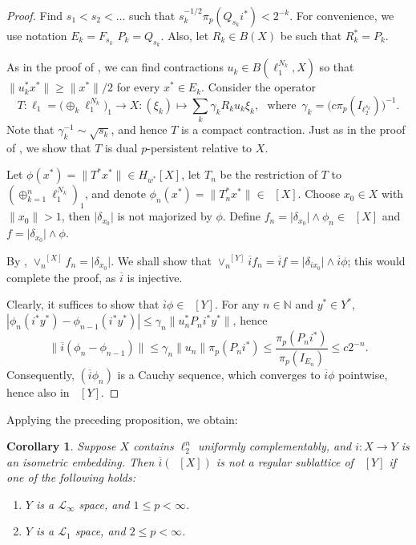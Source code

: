 \documentclass{amsart}
\theoremstyle{plain}
\newtheorem{corollary}[theorem]{Corollary}
\theoremstyle{definition}
\numberwithin{equation}{section}
\newcommand{\N}{\mathbb{N}}
\DeclareMathOperator{\FBLp}{FBL^{\mathit{(p)}}}
\begin{document}
\begin{proof}
Find $s_1 < s_2 < \ldots$ such that $s_k^{-1/2} \pi_p(Q_{s_k} i^*) < 2^{-k}$. For convenience, we use notation $E_k = F_{s_k}$ $P_k = Q_{s_k}$. Also, let $R_k \in B(X)$ be such that $R_k^* = P_k$.

As in the proof of , we can find contractions $u_k \in B(\ell_1^{N_k}, X)$ so that $\|u_k^* x^*\| \geq \|x^*\|/2$ for every $x^* \in E_k$. Consider the operator
$$
T : \ell_1 = \big( \oplus_k \ell_1^{N_k} \big)_1 \to X : (\xi_k) \mapsto \sum_k \gamma_k R_k u_k \xi_k ,
\, \, {\textrm{ where }} \, \gamma_k = \big( c \pi_p(I_{\ell_2^{s_k}}) \big)^{-1}.
$$
Note that $\gamma_k^{-1} \sim \sqrt{s_k}$, and hence $T$ is a compact contraction. Just as in the proof of , we show that $T$ is dual $p$-persistent relative to $X$.

Let $\phi(x^*) = \|T^* x^*\| \in H_{w^*}[X]$, let $T_n$ be the restriction of $T$ to $(\oplus_{k=1}^n \ell_1^{N_k})_1$, and denote $\phi_n(x^*) = \|T_n^* x^*\| \in \FBLp[X]$. Choose $x_0 \in X$ with $\|x_0\| > 1$, then $\big| \delta_{x_0} \big|$ is not majorized by $\phi$. Define $f_n = \big| \delta_{x_0} \big| \wedge \phi_n \in \FBLp[X]$ and $f = \big| \delta_{x_0} \big| \wedge \phi$.

By , $\vee_n^{\FBLp[X]} f_n = \big| \delta_{x_0} \big|$. We shall show that $\vee_n^{\FBLp[Y]} \overline{i} f_n = \overline{i} f = \big| \delta_{i x_0} \big| \wedge \overline{i} \phi$; this would complete the proof, as $\overline{i}$ is injective.

Clearly, it suffices to show that $\overline{i} \phi \in \FBLp[Y]$. For any $n \in \N$ and $y^* \in Y^*$, $|\phi_{n}(i^* y^*) - \phi_{n-1}(i^*y^*)| \leq \gamma_n \|u_n^* P_n i^* y^*\|$, hence
$$
\big\| \overline{i} (\phi_{n} - \phi_{n-1}) \big\| \leq \gamma_n \|u_n\| \pi_p(P_n i^*) \leq \frac{\pi_p(P_n i^*)}{\pi_p(I_{E_n})} \leq c 2^{-n} .
$$
Consequently, $(\overline{i} \phi_n)$ is a Cauchy sequence, which converges to $\overline{i} \phi$ pointwise, hence also in $\FBLp[Y]$.
\end{proof}

Applying the preceding proposition, we obtain:

\begin{corollary}\label{scipt L-infty l1}
Suppose $X$ contains $\ell_2^n$ uniformly complementably, and $i : X \to Y$ is an isometric embedding. Then $\overline{i}(\FBLp[X])$ is not a regular sublattice of $\FBLp[Y]$ if one of the following holds:
\begin{enumerate}
    \item $Y$ is a ${\mathcal L}_\infty$ space, and $1 \leq p < \infty$. 
    \item $Y$ is a ${\mathcal L}_1$ space, and $2 \leq p < \infty$. 
\end{enumerate}
\end{corollary}
\end{document}
